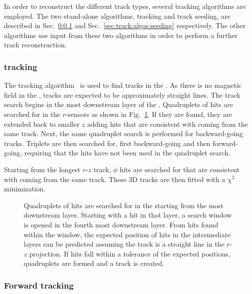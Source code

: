In order to reconstruct the different track types, several tracking algorithms are employed. The two stand-alone algorithms, \velo tracking and track seeding, are described in Sec.~\ref{sec:track:algos:velo} and Sec.~\ref{sec:track:algos:seeding} respectively. The other algorithms use input from these two algorithms in order to perform a further track reconstruction.

\subsubsection{\velo tracking}
\label{sec:track:algos:velo}

The \velo tracking algorithm~\cite{fastvelo} is used to find tracks in the \velo. As there is no magnetic field in the \velo, tracks are expected to be approximately straight lines. The track search begins in the most downstream layer of the \velo. Quadruplets of hits are searched for in the $r$-sensors as shown in Fig.~\ref{fig:velo-tracking}. If they are found, they are extended back to smaller $z$ adding hits that are consistent with coming from the same track. Next, the same quadruplet search is performed for backward-going tracks. Triplets are then searched for, first backward-going and then forward-going, requiring that the hits have not been used in the quadruplet search.

Starting from the longest $r$-$z$ track, $\phi$ hits are searched for that are consistent with coming from the same track. These 3D tracks are then fitted with a $\chi^{2}$ minimization.

\begin{figure}[!htb]
  \centering
  
  \caption{Quadruplets of hits are searched for in the \velo starting from the most downstream layer. Starting with a hit in that layer, a search window is opened in the fourth most downstream layer. From hits found within the window, the expected position of hits in the intermediate layers can be predicted assuming the track is a straight line in the $r$-$z$ projection. If hits fall within a tolerance of the expected positions, quadruplets are formed and a track is created.}
  \label{fig:velo-tracking}
\end{figure}

\subsubsection{Forward tracking}
\label{sec:track:algos:forward}

